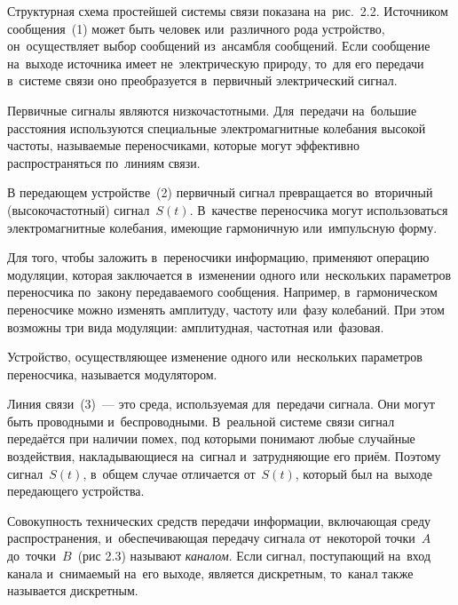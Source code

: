 \documentclass[
	a4paper,
	oneside,
	BCOR = 10mm,
	DIV = 12,
	12pt,
	headings = normal,
]{scrartcl}
\begin{document}
				Структурная схема простейшей системы связи показана на~рис.~2.2. Источником сообщения~(1) может быть человек или~различного рода устройство, он~осуществляет выбор сообщений из~ансамбля сообщений. Если сообщение на~выходе источника имеет не~электрическую природу, то~для его передачи в~системе связи оно преобразуется в~первичный электрический сигнал.

				Первичные сигналы являются низкочастотными. Для~передачи на~большие расстояния используются специальные электромагнитные колебания высокой частоты, называемые переносчиками, которые могут эффективно распространяться по~линиям связи. 

				В передающем устройстве~(2) первичный сигнал превращается во~вторичный (высокочастотный) сигнал~$S(t)$. В~качестве переносчика могут использоваться электромагнитные колебания, имеющие гармоничную или~импульсную форму.

				Для того, чтобы заложить в~переносчики информацию, применяют операцию модуляции, которая заключается в~изменении одного или~нескольких параметров переносчика по~закону передаваемого сообщения. Например, в~гармоническом переносчике можно изменять амплитуду, частоту или~фазу колебаний. При этом возможны три вида модуляции: амплитудная, частотная или~фазовая.

				Устройство, осуществляющее изменение одного или~нескольких параметров переносчика, называется модулятором.

				Линия связи~(3)~— это среда, используемая для~передачи сигнала. Они могут быть проводными и~беспроводными. В~реальной системе связи сигнал передаётся при наличии помех, под которыми понимают любые случайные воздействия, накладывающиеся на~сигнал и~затрудняющие его приём. Поэтому сигнал~$S(t)$, в~общем случае отличается от~$S(t)$, который был на~выходе передающего устройства. 

				Совокупность технических средств передачи информации, включающая среду распространения, и~обеспечивающая передачу сигнала от~некоторой точки~$A$ до~точки~$B$~(рис 2.3) называют \emph{каналом}. Если сигнал, поступающий на~вход канала и~снимаемый на~его выходе, является дискретным, то~канал также называется дискретным.
\end{document}
